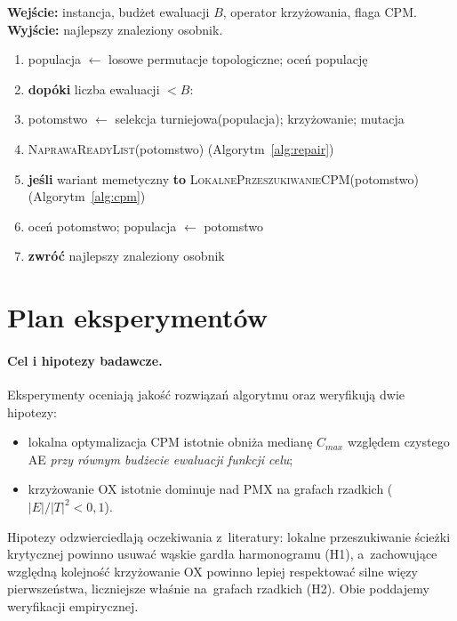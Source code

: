 \documentclass[pdflatex,sn-mathphys,Numbered]{sn-jnl}
\newenvironment{pseudo}
  {\begin{enumerate}[leftmargin=2.6em, itemsep=1pt, topsep=2pt,
     label=\scriptsize\sffamily\arabic*]\small}
  {\end{enumerate}}
\newcommand{\Kw}[1]{\textbf{#1}}%
\newcommand{\In}[1]{\textbf{Wejście:} #1}
\newcommand{\Out}[1]{\textbf{Wyjście:} #1}
\newcommand{\ind}{\hspace*{1.5em}}%
\begin{document}
\begin{algorithm}[H]
\caption{Pętla algorytmu memetycznego (warianty z~CPM i~bez)}
\label{alg:memetic}
\In{instancja, budżet ewaluacji $B$, operator krzyżowania, flaga CPM.}\\
\Out{najlepszy znaleziony osobnik.}
\begin{pseudo}
\item populacja $\gets$ losowe permutacje topologiczne; oceń populację
\item \Kw{dopóki} liczba ewaluacji $< B$:
\item \ind potomstwo $\gets$ selekcja turniejowa(populacja); krzyżowanie; mutacja
\item \ind \textsc{NaprawaReadyList}(potomstwo) \quad(Algorytm~\ref{alg:repair})
\item \ind \Kw{jeśli} wariant memetyczny \Kw{to} \textsc{LokalnePrzeszukiwanieCPM}(potomstwo) \quad(Algorytm~\ref{alg:cpm})
\item \ind oceń potomstwo; populacja $\gets$ potomstwo
\item \Kw{zwróć} najlepszy znaleziony osobnik
\end{pseudo}
\end{algorithm}

\section{Plan eksperymentów}
\label{sec:eksperymenty}
\paragraph{Cel i hipotezy badawcze.}
Eksperymenty oceniają jakość rozwiązań algorytmu oraz weryfikują dwie hipotezy:
\begin{itemize}[itemsep=1pt, topsep=2pt, leftmargin=3em]
    \item[(H1)] lokalna optymalizacja CPM istotnie obniża medianę $C_{max}$ względem czystego AE \emph{przy równym budżecie ewaluacji funkcji celu};
    \item[(H2)] krzyżowanie OX istotnie dominuje nad PMX na grafach rzadkich ($|E|/|T|^2 < 0{,}1$).
\end{itemize}
Hipotezy odzwierciedlają oczekiwania z~literatury: lokalne przeszukiwanie ścieżki
krytycznej powinno usuwać wąskie gardła harmonogramu (H1), a~zachowujące względną
kolejność krzyżowanie OX powinno lepiej respektować silne więzy pierwszeństwa,
liczniejsze właśnie na~grafach rzadkich (H2). Obie poddajemy weryfikacji empirycznej.
\end{document}
